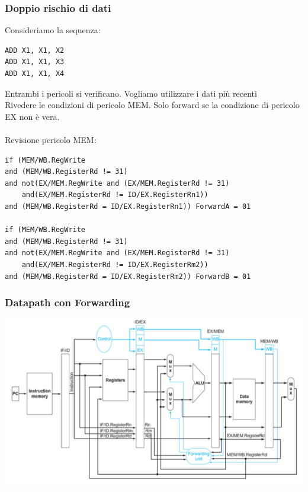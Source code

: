 \documentclass[12pt,a4paper]{article}
\begin{document}
\subsubsection{Doppio rischio di dati}
Consideriamo la sequenza:
\begin{center}
\begin{minipage}{.2\linewidth}
\begin{verbatim}
ADD X1, X1, X2
ADD X1, X1, X3
ADD X1, X1, X4
\end{verbatim}
\end{minipage}
\end{center}
Entrambi i pericoli si verificano. Vogliamo utilizzare i dati più recenti\\
Rivedere le condizioni di pericolo MEM. Solo forward se la condizione di pericolo EX non è vera.\\
\\
Revisione pericolo MEM:
\begin{verbatim}
if (MEM/WB.RegWrite
and (MEM/WB.RegisterRd != 31)
and not(EX/MEM.RegWrite and (EX/MEM.RegisterRd != 31)
    and(EX/MEM.RegisterRd != ID/EX.RegisterRn1))
and (MEM/WB.RegisterRd = ID/EX.RegisterRn1)) ForwardA = 01

if (MEM/WB.RegWrite
and (MEM/WB.RegisterRd != 31)
and not(EX/MEM.RegWrite and (EX/MEM.RegisterRd != 31)
    and(EX/MEM.RegisterRd != ID/EX.RegisterRm2))
and (MEM/WB.RegisterRd = ID/EX.RegisterRm2)) ForwardB = 01
\end{verbatim}

\subsubsection{Datapath con Forwarding}
\begin{center}
\includegraphics[width=0.6\columnwidth]{img/datapath_fwd.png}
\end{center}
\end{document}
